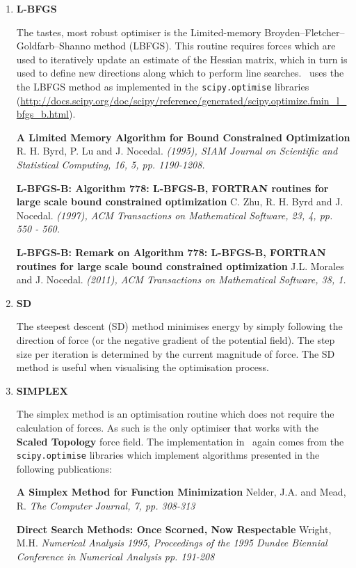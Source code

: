  \begin{enumerate}

\item \textbf{L-BFGS}

The tastes, most robust optimiser is the Limited-memory Broyden--Fletcher--Goldfarb--Shanno method (LBFGS). This routine requires forces which are used to iteratively update an estimate of the Hessian matrix, which in turn is used to define new directions along which to perform line searches. \nanocap~uses the the LBFGS method as implemented in the \texttt{scipy.optimise} libraries (\url{http://docs.scipy.org/doc/scipy/reference/generated/scipy.optimize.fmin_l_bfgs_b.html}). 


\textbf{A Limited Memory Algorithm for Bound Constrained Optimization} R. H. Byrd, P. Lu and J. Nocedal.  \textit{(1995), SIAM Journal on Scientific and Statistical Computing, 16, 5, pp. 1190-1208.}

\textbf{L-BFGS-B: Algorithm 778: L-BFGS-B, FORTRAN routines for large scale bound constrained optimization} C. Zhu, R. H. Byrd and J. Nocedal.  \textit{(1997), ACM Transactions on Mathematical Software, 23, 4, pp. 550 - 560.}

\textbf{L-BFGS-B: Remark on Algorithm 778: L-BFGS-B, FORTRAN routines for large scale bound constrained optimization} J.L. Morales and J. Nocedal.  \textit{ (2011), ACM Transactions on Mathematical Software, 38, 1.}

\item \textbf{SD}

The steepest descent (SD) method minimises energy by simply following the direction of force (or the negative gradient of the potential field). The step size per iteration is determined by the current magnitude of force. The SD method is useful when visualising the optimisation process.

\item \textbf{SIMPLEX}

The simplex method is an optimisation routine which does not require the calculation of forces. As such is the only optimiser that works with the \textbf{Scaled Topology} force field. The implementation in \nanocap~again comes from the \texttt{scipy.optimise} libraries which implement algorithms presented in the following publications:

\textbf{A Simplex Method for Function Minimization} Nelder, J.A. and Mead, R. \textit{The Computer Journal, 7, pp. 308-313}

\textbf{Direct Search Methods: Once Scorned, Now Respectable} Wright, M.H.  \textit{Numerical Analysis 1995, Proceedings of the 1995 Dundee Biennial Conference in Numerical Analysis pp. 191-208}


 \end{enumerate}
